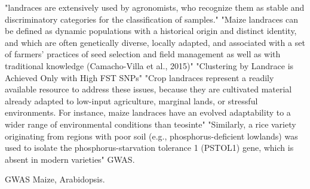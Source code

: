 \documentclass[10pt,letterpaper]{article}
\begin{document}
"landraces are extensively used by agronomists, who recognize them as stable and discriminatory categories for the classification of samples." \cite{CalduPrimo:2017eh} "Maize landraces can be defined as dynamic populations with a historical origin and distinct identity, and which are often genetically diverse, locally adapted, and associated with a set of farmers’ practices of seed selection and field management as well as with traditional knowledge (Camacho-Villa et al., 2015)" \cite{CalduPrimo:2017eh} "Clustering by Landrace is Achieved Only with High FST SNPs"\cite{CalduPrimo:2017eh} "Crop landraces represent a readily available resource to address these issues, because they are cultivated material already adapted to low-input agriculture, marginal lands, or stressful environments. For instance, maize landraces have an evolved adaptability to a wider range of environmental conditions than teosinte" \cite{GiandomenicoCorrado:2017bk} "Similarly, a rice variety originating from regions with poor soil (e.g., phosphorus-deficient lowlands) was used to isolate the phosphorus-starvation tolerance 1 (PSTOL1) gene, which is absent in modern varieties" \cite{GiandomenicoCorrado:2017bk}
GWAS.


GWAS Maize, Arabidopsis.
\end{document}
